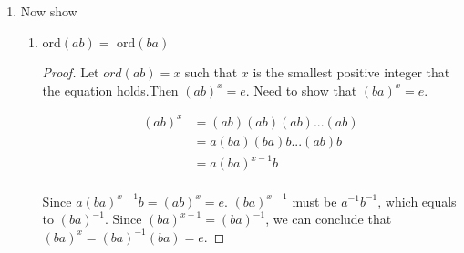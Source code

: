 \documentclass[12pt]{article}
\begin{document}
\begin{enumerate}
\begin{enumerate}[label=(\alph*)]
\begin{proof}
			Next, we need to show that $x$ is the smallest positive integer such that $(bab^{-1})^x = e$. Suppose there exists a positive integer $y$ such that $(bab^{-1})^y = e$ and $y < x$. Then, we can write $a^y = b^{-1}ba^y b^{-1}b = b^{-1}(bab^{-1})^y b = b^{-1}e b = e$, which contradicts the fact that $x$ is the smallest positive integer such that $a^x = e$. Therefore, $x$ is the smallest positive integer such that $(bab^{-1})^x = e$.
			Therefore, the order of $(bab^{-1})$ is $x$, which equals to the order of $a$.
			\end{proof}
			\item ord$(a^{-1}) = $ ord$(a)$
			\begin{proof}
					Let $ord(a) = x$ such that $x$ is the smallest positive integer that the equation holds.Then $a^x = e$. Need to show that $(a^{-1})^x = e$. According to the law of exponents, we know that $(a^{-1})^x  = (a^{x})^{-1} = e^{-1} =e$.
				
					Next, we need to show that $x$ is the smallest positive integer such that $(a^{-1})^x = e$. Suppose there exists a positive integer $y$ such that $(a^{-1})^y = e$ and $y < x$.  Then, we can write $a^y = ((a^{-1})^y)^{-1}= e^{-1} =e$, which contradicts the fact that $x$ is the smallest positive integer such that $a^x = e$. Therefore, $x$ is the smallest positive integer such that $(a^{-1})^x = e$. 
					Therefore, the order of $(a^{-1})$ is $x$, which equals to the order of $a$.
					
			\end{proof}
		\end{enumerate}
		\item Now show
		\begin{enumerate}[label=(\alph*)]
			\item ord$(ab) = $ ord$(ba)$
			\begin{proof}
			Let $ord(ab) = x$ such that $x$ is the smallest positive integer that the equation holds.Then $(ab)^x = e$. Need to show that $(ba)^x = e$. 
			
			\begin{align*}
				(ab)^x &= (ab)(ab)(ab)...(ab)\\
				&= a(ba)(ba)b...(ab)b\\
				&= a (ba)^{x-1} b\\
			\end{align*}
		
		Since $a (ba)^{x-1} b = (ab)^x  = e$. $(ba)^{x-1} $ must be $a^{-1}b^{-1}$, which equals to $(ba)^{-1}$. Since  $(ba)^{x-1}=  (ba)^{-1}$, we can conclude that $(ba)^x = (ba)^{-1} (ba)= e $.
		

\end{proof}
\end{enumerate}
\end{enumerate}
\end{document}
